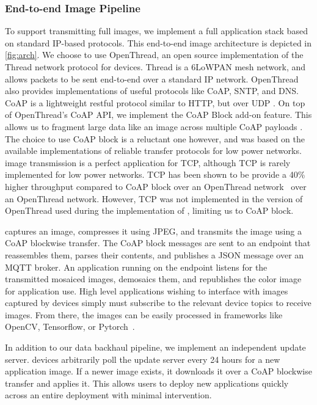\subsubsection{End-to-end Image Pipeline}
To support transmitting full images, we implement a full application stack based on standard IP-based protocols. This end-to-end image architecture is depicted in \cref{fig:arch}.
We choose to use OpenThread, an open source implementation of the Thread network protocol for \namec devices. Thread is a 6LoWPAN mesh network, and allows packets to be sent end-to-end over a standard IP network. OpenThread also provides implementations of useful protocols like CoAP, SNTP, and DNS. 
CoAP is a lightweight restful protocol similar to HTTP, but over UDP \cite{shelby2014constrained}. 
On top of OpenThread's CoAP API, we implement the CoAP Block add-on feature. This allows us to fragment large data like an image across multiple CoAP payloads \cite{bormann2016block}. 
The choice to use CoAP block is a reluctant one however, and was based on the available implementations of reliable transfer protocols for low power networks.
\namec image transmission is a perfect application for TCP, although TCP is rarely implemented for low power networks. TCP has been shown to be provide a 40\% higher throughput compared to CoAP block over an OpenThread network~\cite{kumar2020performant} over an OpenThread network. However, TCP was not implemented in the version of OpenThread used during the implementation of \namec, limiting us to CoAP block.


\namec captures an image, compresses it using JPEG, and transmits the image using a CoAP blockwise transfer. The CoAP block messages are sent to an endpoint that reassembles them, parses their contents, and publishes a JSON message over an MQTT broker. An application running on the endpoint listens for the transmitted mosaiced images, demosaics them, and republishes the color image for application use. High level applications wishing to interface with images captured by \namec devices simply must subscribe to the relevant device topics to receive images. From there, the images can be easily processed in frameworks like OpenCV, Tensorflow, or Pytorch~\cite{tensorflow2015-whitepaper, pytorch,itseez2015opencv}.

In addition to our data backhaul pipeline, we implement an independent update server. \namec devices arbitrarily poll the update server every 24 hours for a new application image. If a newer image exists, it downloads it over a CoAP blockwise transfer and applies it. This allows users to deploy new applications quickly across an entire deployment with minimal intervention.

